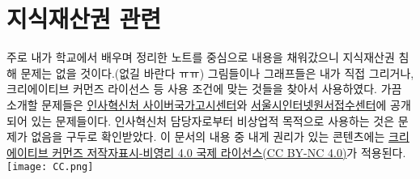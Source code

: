\section{지식재산권 관련}
주로 내가 학교에서 배우며 정리한 노트를 중심으로 내용을 채워갔으니 지식재산권 침해 문제는 없을 것이다.(없길 바란다 ㅠㅠ) 
그림들이나 그래프들은 내가 직접 그리거나, 크리에이티브 커먼즈 라이선스 등 사용 조건에 맞는 것들을 찾아서 사용하였다.
가끔 소개할 문제들은 \href{https://www.gosi.kr}{인사혁신처 사이버국가고시센터}와 \href{http://gosi.seoul.go.kr}{서울시인터넷원서접수센터}에 공개되어 있는 문제들이다.
인사혁신처 담당자로부터 비상업적 목적으로 사용하는 것은 문제가 없음을 구두로 확인받았다.
이 문서의 내용 중 내게 권리가 있는 콘텐츠에는 \href{https://creativecommons.org/licenses/by-nc/4.0/}{크리에이티브 커먼즈 저작자표시-비영리 4.0 국제 라이선스(CC BY-NC 4.0)}가 적용된다.
\\
\texttt{[image: CC.png]}
